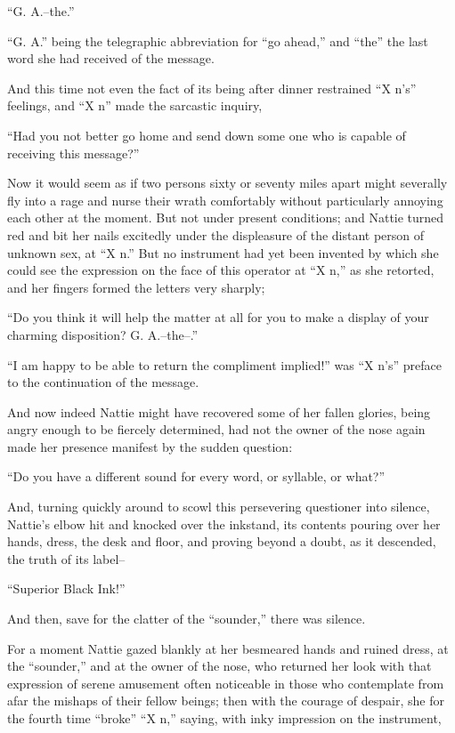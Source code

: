 ``G. A.--the.''

``G. A.'' being the telegraphic abbreviation for ``go ahead,'' and ``the'' the
last word she had received of the message.

And this time not even the fact of its being after dinner restrained ``X
n's'' feelings, and ``X n'' made the sarcastic inquiry,

``Had you not better go home and send down some one who is capable of
receiving this message?''

Now it would seem as if two persons sixty or seventy miles apart might
severally fly into a rage and nurse their wrath comfortably without
particularly annoying each other at the moment. But not under present
conditions; and Nattie turned red and bit her nails excitedly under the
displeasure of the distant person of unknown sex, at ``X n.'' But no
instrument had yet been invented by which she could see the expression
on the face of this operator at ``X n,'' as she retorted, and her fingers
formed the letters very sharply;

``Do you think it will help the matter at all for you to make a display
of your charming disposition? G. A.--the--.''

``I am happy to be able to return the compliment implied!'' was ``X n's''
preface to the continuation of the message.

And now indeed Nattie might have recovered some of her fallen glories,
being angry enough to be fiercely determined, had not the owner of the
nose again made her presence manifest by the sudden question:

``Do you have a different sound for every word, or syllable, or what?''

And, turning quickly around to scowl this persevering questioner into
silence, Nattie's elbow hit and knocked over the inkstand, its contents
pouring over her hands, dress, the desk and floor, and proving beyond a
doubt, as it descended, the truth of its label--

``Superior Black Ink!''

And then, save for the clatter of the ``sounder,'' there was silence.

For a moment Nattie gazed blankly at her besmeared hands and ruined
dress, at the ``sounder,'' and at the owner of the nose, who returned her
look with that expression of serene amusement often noticeable in those
who contemplate from afar the mishaps of their fellow beings; then with
the courage of despair, she for the fourth time ``broke'' ``X n,'' saying,
with inky impression on the instrument,

